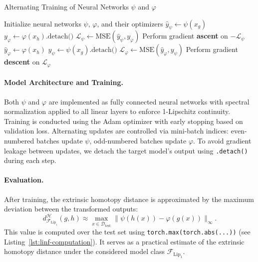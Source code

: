 \begin{algorithm}[H]
\caption{Alternating Training of Neural Networks \(\psi\) and \(\varphi\)}
\label{alg:alternating-training}
\begin{algorithmic}[1]
\State Initialize neural networks \(\psi\), \(\varphi\), and their optimizers
         
            \State \(\hat{y}_\psi \gets \psi(x_g)\)
            \State \(y_\varphi \gets \varphi(x_h).\text{detach()}\)
            \State \(\mathcal{L}_\psi \gets \text{MSE}(\hat{y}_\psi, y_\varphi)\)
            \State Perform gradient \textbf{ascent} on \(-\mathcal{L}_\psi\)
        \Else {}
            \State \(\hat{y}_\varphi \gets \varphi(x_h)\)
            \State \(y_\psi \gets \psi(x_g).\text{detach()}\)
            \State \(\mathcal{L}_\varphi \gets \text{MSE}(\hat{y}_\varphi, y_\psi)\)
            \State Perform gradient \textbf{descent} on \(\mathcal{L}_\varphi\)
        \EndIf
    \EndFor
\EndFor
\end{algorithmic}
\end{algorithm}

\paragraph{Model Architecture and Training.}
Both \( \psi \) and \( \varphi \) are implemented as fully connected neural networks with spectral normalization applied to all linear layers to enforce 1-Lipschitz continuity.  
Training is conducted using the Adam optimizer with early stopping based on validation loss.  
Alternating updates are controlled via mini-batch indices: even-numbered batches update \( \psi \), odd-numbered batches update \( \varphi \).  
To avoid gradient leakage between updates, we detach the target model’s output using \texttt{.detach()} during each step.

\paragraph{Evaluation.}
After training, the extrinsic homotopy distance is approximated by the maximum deviation between the transformed outputs:
\[
d^\mathcal{H}_{\mathcal{F}_{\text{Lip}_1}}(g, h) \approx \max_{x \in \mathcal{D}_{\mathrm{test}}} \| \psi(h(x)) - \varphi(g(x)) \|_\infty.
\]
This value is computed over the test set using \texttt{torch.max(torch.abs(...))} (see Listing~\ref{lst:linf-computation}).  
It serves as a practical estimate of the extrinsic homotopy distance under the considered model class \( \mathcal{F}_{\text{Lip}_1} \).

